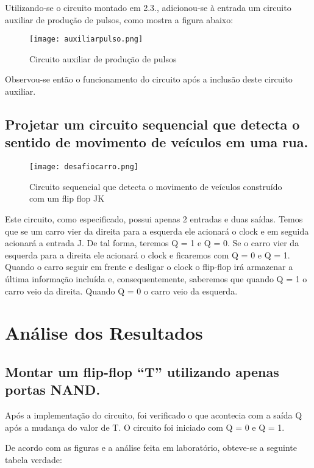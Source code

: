 \documentclass[12pt]{article}
\begin{document}
Utilizando-se o circuito montado em 2.3., adicionou-se à entrada um circuito auxiliar de produção de pulsos, como mostra a figura abaixo:


\begin{figure}[H]
	\centering
	\texttt{[image: auxiliarpulso.png]}
	\caption{Circuito auxiliar de produção de pulsos}
	\label{fig:auxiliarpulsoexp}
\end{figure}

Observou-se então o funcionamento do circuito após a inclusão deste circuito auxiliar.

\subsection{Projetar um circuito sequencial que detecta o sentido de movimento de veículos em uma rua.}
\label{2.5}

\begin{figure}[H]
	\centering
	\texttt{[image: desafiocarro.png]}
	\caption{Circuito sequencial que detecta o movimento de veículos construído com um flip flop JK}
	\label{fig:desafiocarroexp}
\end{figure}

Este circuito, como especificado, possui apenas 2 entradas e duas saídas. Temos que se um carro vier da direita para a esquerda ele acionará o clock e em seguida acionará a entrada J. De tal forma, teremos Q = 1  e Q = 0. Se o carro vier da esquerda para a direita ele acionará o clock e ficaremos com Q = 0 e Q = 1. Quando o carro seguir em frente e desligar o clock o flip-flop irá armazenar a última informação incluída e, consequentemente, saberemos que quando Q = 1 o carro veio da direita. Quando Q = 0 o carro veio da esquerda. 



\section{Análise dos Resultados}
\label{sec:Resultados}

\subsection{Montar um flip-flop “T” utilizando apenas portas NAND.}
Após a implementação do circuito, foi verificado o que acontecia com a saída Q após a mudança do valor de T. O circuito foi iniciado com  Q = 0 e Q = 1. 

De acordo com as figuras e a análise feita em laboratório, obteve-se a seguinte tabela verdade:
\end{document}
